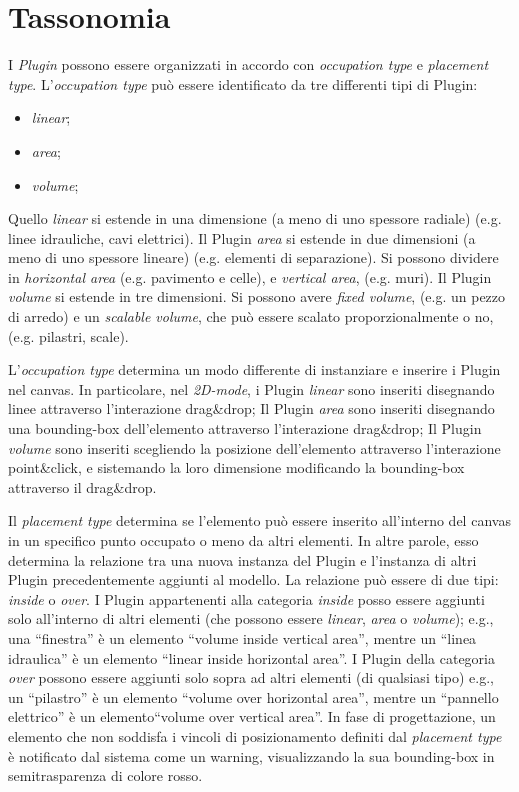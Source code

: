 \section{Tassonomia}
\label{sec:chapter_3_section_2}

\noindent
I \emph{Plugin} possono essere organizzati in accordo con \emph{occupation type} e \emph{placement type}.
L'\emph{occupation type} può essere identificato da tre differenti tipi di Plugin:
\begin{itemize}
  \item \emph{linear};
  \item \emph{area};
  \item \emph{volume};
\end{itemize}
Quello \emph{linear} si estende in una dimensione (a meno di uno spessore radiale) (e.g. linee idrauliche, cavi elettrici).
Il Plugin \emph{area} si estende in due dimensioni (a meno di uno spessore lineare) (e.g. elementi di separazione).
Si possono dividere in \emph{horizontal area} (e.g. pavimento e celle), e \emph{vertical area}, (e.g. muri).
Il Plugin \emph{volume} si estende in tre dimensioni. Si possono avere \emph{fixed volume}, (e.g. un pezzo di arredo) e
un \emph{scalable volume}, che può essere scalato proporzionalmente o no, (e.g. pilastri, scale).


L'\emph{occupation type} determina un modo differente di instanziare e inserire i Plugin nel canvas.
In particolare, nel \emph{2D-mode}, i Plugin \emph{linear} sono inseriti disegnando linee attraverso l'interazione drag\&drop;
Il Plugin \emph{area} sono inseriti disegnando una bounding-box dell'elemento attraverso l'interazione drag\&drop;
Il Plugin \emph{volume} sono inseriti scegliendo la posizione dell'elemento attraverso l'interazione point\&click,
e sistemando la loro dimensione modificando la bounding-box attraverso il drag\&drop.


Il \emph{placement type} determina se l'elemento può essere inserito all'interno del canvas in un specifico punto occupato o meno
da altri elementi. In altre parole, esso determina la relazione tra una nuova instanza del Plugin e l'instanza di altri
Plugin precedentemente aggiunti al modello. La relazione può essere di due tipi: \emph{inside} o \emph{over}.
I Plugin appartenenti alla categoria \emph{inside} posso essere aggiunti solo all'interno di altri elementi (che possono essere
\emph{linear}, \emph{area} o \emph{volume}); e.g., una ``finestra'' è un elemento ``volume inside vertical area'',
mentre un ``linea idraulica'' \`e un elemento ``linear inside horizontal area''.
I Plugin della categoria \emph{over} possono essere aggiunti solo sopra ad altri elementi (di qualsiasi tipo)
e.g., un ``pilastro'' \`e un elemento ``volume over horizontal area'',
mentre un ``pannello elettrico'' è un elemento``volume over vertical area''.
In fase di progettazione, un elemento che non soddisfa i vincoli di posizionamento definiti dal \emph{placement type} \`e
notificato dal sistema come un warning, visualizzando la sua bounding-box in semitrasparenza di colore rosso.
\newpage
